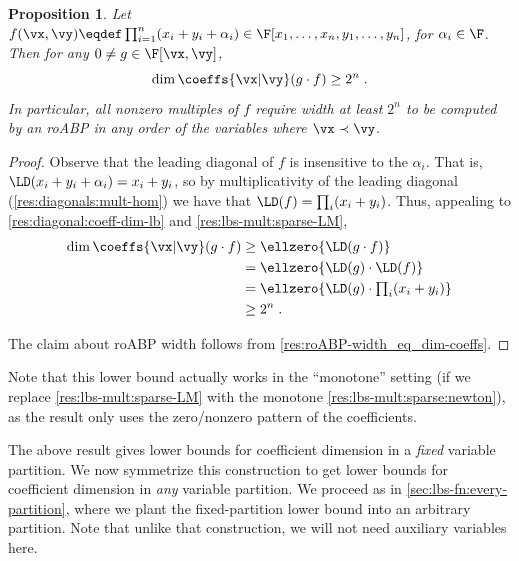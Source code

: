\documentclass[11pt]{article}
\numberwithin{equation}{section}
\newtheorem{proposition}[theorem]{Proposition}
\theoremstyle{definition}
\theoremstyle{plain}
\begin{document}
\begin{proposition}\label{prop:good-f-roabp}
        Let $f(\vx,\vy)\eqdef\prod_{i=1}^n (x_i+y_i+\alpha_i)\in\F[x_1,\ldots,x_n,y_1,\ldots,y_n]$, for $\alpha_i\in\F$.  Then for any $0\ne g\in\F[\vx,\vy]$,
        \[
                \dim\coeffs{\vx|\vy}(g\cdot f)\ge 2^n
                \;.
        \]
        In particular, all nonzero multiples of $f$ require width at least $2^n$ to be computed by an roABP in any order of the variables where $\vx\prec \vy$.
\end{proposition}
\begin{proof}
        Observe that the leading diagonal of $f$ is insensitive to the $\alpha_i$.  That is, $\LD(x_i+y_i+\alpha_i)=x_i+y_i$, so by multiplicativity of the leading diagonal (\autoref{res:diagonals:mult-hom}) we have that $\LD(f)=\prod_i (x_i+y_i)$.  Thus, appealing to \autoref{res:diagonal:coeff-dim-lb} and \autoref{res:lbs-mult:sparse-LM},
        \begin{align*}
                \dim\coeffs{\vx|\vy}(g\cdot f)
                &\ge \ellzero{\LD(g\cdot f)}\\
                &=\ellzero{\LD(g)\cdot \LD(f)}\\
                &=\textstyle\ellzero{\LD(g)\cdot \prod_i (x_i+y_i)}\\
                &\ge 2^n
                \;.
        \end{align*}

        The claim about roABP width follows from \autoref{res:roABP-width_eq_dim-coeffs}.
\end{proof}

Note that this lower bound actually works in the ``monotone'' setting (if we replace \autoref{res:lbs-mult:sparse-LM} with the monotone \autoref{res:lbs-mult:sparse:newton}), as the result only uses the zero/nonzero pattern of the coefficients.

The above result gives lower bounds for coefficient dimension in a \emph{fixed} variable partition. We now symmetrize this construction to get lower bounds for coefficient dimension in \emph{any} variable partition.  We proceed as in \autoref{sec:lbs-fn:every-partition}, where we plant the fixed-partition lower bound into an arbitrary partition.  Note that unlike that construction, we will not need auxiliary variables here.
\end{document}
